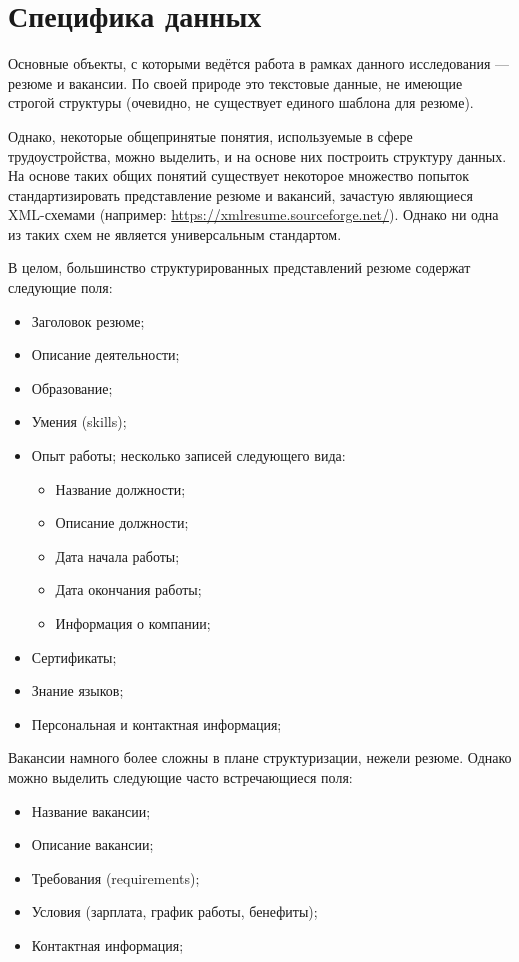 \documentclass[14pt]{mmcs_article}
\begin{document}
\newpage
\section{Специфика данных}\label{data_specification}

Основные объекты, с которыми ведётся работа в рамках данного исследования --- резюме и вакансии. По своей природе это текстовые данные, не имеющие строгой структуры (очевидно, не существует единого шаблона для резюме).

Однако, некоторые общепринятые понятия, используемые в сфере трудоустройства, можно выделить, и на основе них построить структуру данных. На основе таких общих понятий существует некоторое множество попыток стандартизировать представление резюме и вакансий, зачастую являющиеся XML-схемами (например: \url{https://xmlresume.sourceforge.net/}). Однако ни одна из таких схем не является универсальным стандартом.

В целом, большинство структурированных представлений резюме содержат следующие поля:

\begin{itemize}
  \item Заголовок резюме;
  \item Описание деятельности;
  \item Образование;
  \item Умения (skills);
  \item Опыт работы; несколько записей следующего вида:
        \begin{itemize}
          \item Название должности;
          \item Описание должности;
          \item Дата начала работы;
          \item Дата окончания работы;
          \item Информация о компании;
        \end{itemize}
  \item Сертификаты;
  \item Знание языков;
  \item Персональная и контактная информация;
\end{itemize}

Вакансии намного более сложны в плане структуризации, нежели резюме. Однако можно выделить следующие часто встречающиеся поля:

\begin{itemize}
  \item Название вакансии;
  \item Описание вакансии;
  \item Требования (requirements);
  \item Условия (зарплата, график работы, бенефиты);
  \item Контактная информация;
\end{itemize}
\end{document}
